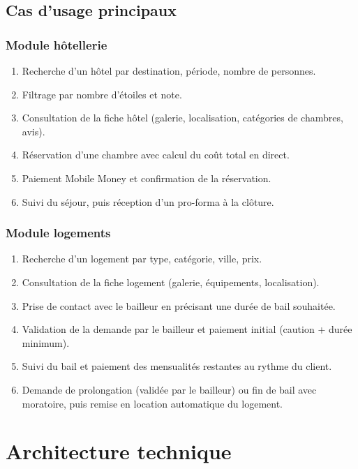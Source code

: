 \documentclass[11pt,a4paper]{report}
\begin{document}
\section{Cas d'usage principaux}

\subsection{Module hôtellerie}
\begin{enumerate}[leftmargin=1.2cm]
    \item Recherche d'un hôtel par destination, période, nombre de personnes.
    \item Filtrage par nombre d'étoiles et note.
    \item Consultation de la fiche hôtel (galerie, localisation, catégories de chambres, avis).
    \item Réservation d'une chambre avec calcul du coût total en direct.
    \item Paiement Mobile Money et confirmation de la réservation.
    \item Suivi du séjour, puis réception d'un pro-forma à la clôture.
\end{enumerate}

\subsection{Module logements}
\begin{enumerate}[leftmargin=1.2cm]
    \item Recherche d'un logement par type, catégorie, ville, prix.
    \item Consultation de la fiche logement (galerie, équipements, localisation).
    \item Prise de contact avec le bailleur en précisant une durée de bail souhaitée.
    \item Validation de la demande par le bailleur et paiement initial (caution + durée minimum).
    \item Suivi du bail et paiement des mensualités restantes au rythme du client.
    \item Demande de prolongation (validée par le bailleur) ou fin de bail avec moratoire, puis remise en location automatique du logement.
\end{enumerate}

\chapter{Architecture technique}
\end{document}
